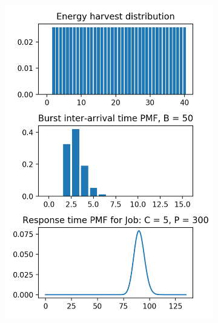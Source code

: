 \documentclass[a4paper,oneside]{csthesis}
\begin{document}
\begin{figure}[ht]
\begin{subfigure}[b]{0.45\textwidth}
        \includegraphics[width=\textwidth]{figures/energy3.png}
    \end{subfigure}
    ~
    \begin{subfigure}[b]{0.45\textwidth}
        \caption{}
        \label{subfig:energy4}

\end{subfigure}
\end{figure}
\end{document}
